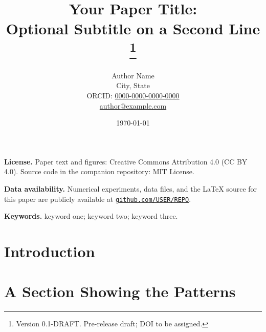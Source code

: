 \documentclass[12pt, letterpaper]{article}
\title{Your Paper Title:\\
       Optional Subtitle on a Second Line%
       \thanks{Version 0.1-DRAFT.
       Pre-release draft; DOI to be assigned.}}
\author{Author Name\\
        \small City, State\\
        \small ORCID: \href{https://orcid.org/0000-0000-0000-0000}{0000-0000-0000-0000}\\
        \small \href{mailto:author@example.com}{author@example.com}}
\date{\today}
\begin{document}
\maketitle

\noindent\textbf{License.}  Paper text and figures: Creative Commons
Attribution 4.0 (CC BY 4.0).  Source code in the companion
repository: MIT License.

\medskip
\noindent\textbf{Data availability.}  Numerical experiments, data
files, and the LaTeX source for this paper are publicly available at
\href{https://github.com/USER/REPO}%
     {\nolinkurl{github.com/USER/REPO}}.

\medskip
\noindent\textbf{Keywords.}  keyword one; keyword two; keyword three.

\newpage

\begin{abstract}
    
\end{abstract}



\newpage
\tableofcontents
\newpage

\section{Introduction}


\section{A Section Showing the Patterns}

\end{document}
